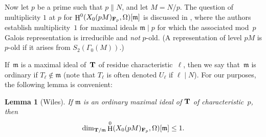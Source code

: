 \documentclass[10pt,twoside]{article}
\newcommand{\F}{{\bf{F}}}
\newcommand{\T}{{\bf{T}}}
\newcommand{\m}{{\mathfrak{m}}}
\newcommand{\Fp}{{{\F}_p}}
\renewcommand{\H}{\HHH}
\newtheorem{lem}{Lemma}[section]
\theoremstyle{definition}
\DeclareMathOperator{\ord}{ord}
\DeclareMathOperator{\HHH}{H}
\begin{document}
Now\label{NPnotation} 
let $p$ be a prime such that $p \parallel N$, and let $M = N/p$.
The question of multiplicity $1$ at $p$ for $\H^0(X_0(pM)_{\Fp},
\Omega)[\m]$ is discussed in \cite{mazur-ribet}, where the authors
establish multiplicity~$1$ for maximal ideals $\m\mid p$ for which the
associated mod~$p$ Galois representation is irreducible and {\em not}
$p$-old.  (A representation of level $pM$ is $p$-old if it arises from
$S_2(\Gamma_0(M))$.)

If~$\m$ is a maximal ideal of~$\T$ of residue characteristic~$\ell$, 
then we say that~$\m$ is ordinary
if $T_\ell \not\in \m$ (note that $T_\ell$ is often denoted $U_\ell$ 
if $\ell \mid N$). For our purposes, the following lemma is convenient:

\begin{lem}[Wiles]\label{lem:wiles}
If $\m$ is an ordinary maximal ideal of $\T$ of characteristic~$p$, then
$$
 \dim_{\T/\m} \H^0(X_0(pM)_{\Fp},\Omega)[\m] \leq 1.
$$
\end{lem}
\end{document}
